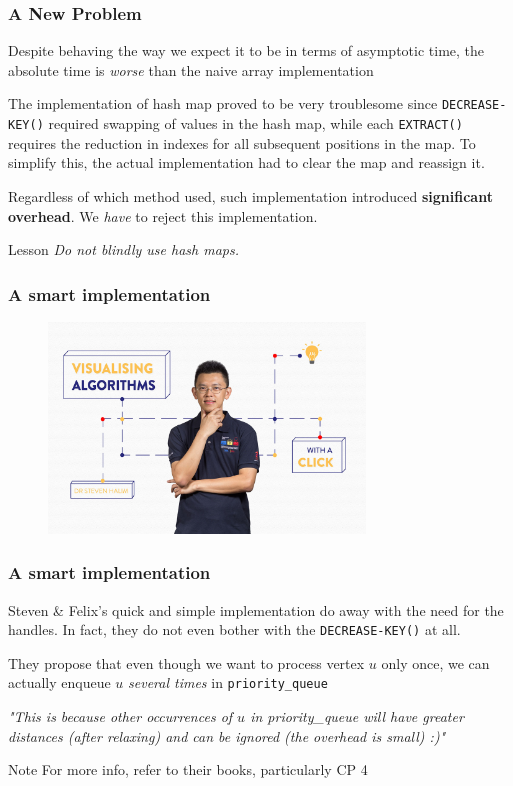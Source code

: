 \documentclass{beamer}
\begin{document}
\begin{frame}
	\frametitle{A New Problem}
	Despite behaving the way we expect it to be in terms of asymptotic time, the absolute time is \emph{worse} than the naive array implementation \newline

	The implementation of hash map proved to be very troublesome since \texttt{DECREASE-KEY()} required swapping of values in the hash map, while each \texttt{EXTRACT()} requires the reduction in indexes for all subsequent positions in the map. To simplify this, the actual implementation had to clear the map and reassign it. \newline

	Regardless of which method used, such implementation introduced \textbf{significant overhead}. We \emph{have} to reject this implementation.
	\onslide<2> \begin{block}{Lesson}
		\emph{Do not blindly use hash maps.}
	\end{block}	
\end{frame}

\begin{frame}
	\frametitle{A smart implementation}
	\begin{figure}
		\centering
		\includegraphics[width=0.75\textwidth]{pict/secret3.jpg}
	\end{figure}
\end{frame}

\begin{frame}
	\frametitle{A smart implementation}
	Steven \& Felix's quick and simple implementation do away with the need for the handles. In fact, they do not even bother with the \texttt{DECREASE-KEY()} at all. \newline

	They propose that even though we want to process vertex $u$ only once,  we can
	actually enqueue $u$ \emph{several times} in \texttt{priority\_queue} \newline

\emph{"This is because other occurrences of $u$ in priority\_queue will have greater distances (after relaxing) and can be ignored (the overhead is small) :)"}
	\begin{block}{Note}
		For more info, refer to their books, particularly CP 4
	\end{block}
\end{frame}
\end{document}
